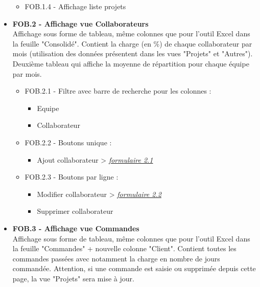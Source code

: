 \documentclass[french]{report}
\begin{document}
\begin{itemize}[label=\textbullet, font=\normalfont \color{blue}]
\begin{itemize}[label=\textbullet]
    \item{FOB.1.4 - Affichage liste projets}

  \end{itemize}

  \item{\textbf{FOB.2 - Affichage vue Collaborateurs}}\\
Affichage sous forme de tableau, même colonnes que pour l’outil Excel dans la
feuille "Consolidé". Contient la charge (en \%) de chaque collaborateur par mois
(utilisation des données présentent dans les vues "Projets" et "Autres"). Deuxième
tableau qui affiche la moyenne de répartition pour chaque équipe par mois.

  \begin{itemize}[label=\textbullet]
    \item{FOB.2.1 - Filtre avec barre de recherche pour les colonnes :}

    \begin{itemize}[label=-]
      \item{Equipe}
      \item{Collaborateur}
    \end{itemize}

    \item{FOB.2.2 - Boutons unique :}

    \begin{itemize}[label=-]
      \item{Ajout collaborateur} > \hyperref[sec:2.1]{\emph{formulaire 2.1}}
    \end{itemize}

    \item{FOB.2.3 - Boutons par ligne :}

    \begin{itemize}[label=-]
      \item{Modifier collaborateur} > \hyperref[sec:2.2]{\emph{formulaire 2.2}}
      \item{Supprimer collaborateur}
    \end{itemize}

  \end{itemize}

  \item{\textbf{FOB.3 - Affichage vue Commandes}}\\
Affichage sous forme de tableau, même colonnes que pour l’outil Excel dans la
feuille "Commandes" + nouvelle colonne "Client". Contient toutes les commandes
passées avec notamment la charge en nombre de jours commandée. Attention, si
une commande est saisie ou supprimée depuis cette page, la vue "Projets" sera
mise à jour.


\end{itemize}
\end{document}
